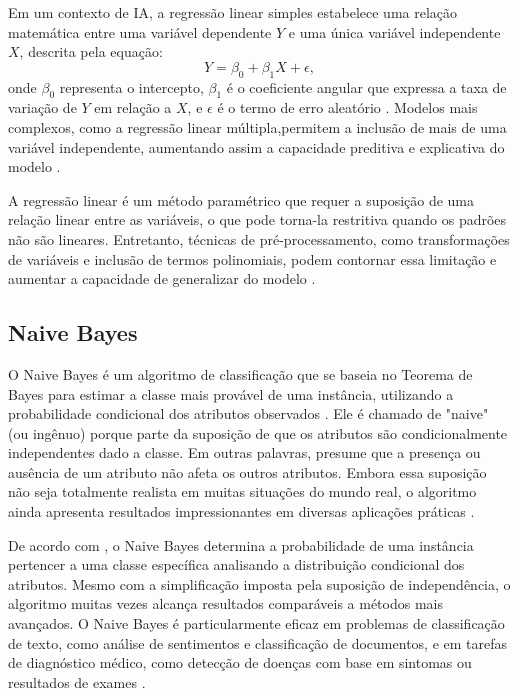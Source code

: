 Em um contexto de IA, a regressão linear simples estabelece uma relação matemática entre uma variável dependente \( Y \) e uma única variável independente \( X \), descrita pela equação:
\[
Y = \beta_0 + \beta_1 X + \epsilon,
\]
onde \( \beta_0 \) representa o intercepto, \( \beta_1 \) é o coeficiente angular que expressa a taxa de variação de \( Y \) em relação a \( X \), e \( \epsilon \) é o termo de erro aleatório \cite{rodrigues}. Modelos mais complexos, como a regressão linear múltipla,permitem a inclusão de mais de uma variável independente, aumentando assim a capacidade preditiva e explicativa do modelo \cite{rodrigues}.

A regressão linear é um método paramétrico que requer a suposição de uma relação linear entre as variáveis, o que pode torna-la restritiva quando os padrões não são lineares. Entretanto, técnicas de pré-processamento, como transformações de variáveis e inclusão de termos polinomiais, podem contornar essa limitação e aumentar a capacidade de generalizar do modelo \cite{montgomery2009}.

\subsection{Naive Bayes}
O Naive Bayes é um algoritmo de classificação que se baseia no Teorema de Bayes para estimar a classe mais provável de uma instância, utilizando a probabilidade condicional dos atributos observados \cite{rish2001}. Ele é chamado de "naive" (ou ingênuo) porque parte da suposição de que os atributos são condicionalmente independentes dado a classe. Em outras palavras, presume que a presença ou ausência de um atributo não afeta os outros atributos. Embora essa suposição não seja totalmente realista em muitas situações do mundo real, o algoritmo ainda apresenta resultados impressionantes em diversas aplicações práticas \cite{rish2001}.

De acordo com , o Naive Bayes determina a probabilidade de uma instância pertencer a uma classe específica analisando a distribuição condicional dos atributos. Mesmo com a simplificação imposta pela suposição de independência, o algoritmo muitas vezes alcança resultados comparáveis a métodos mais avançados. O Naive Bayes é particularmente eficaz em problemas de classificação de texto, como análise de sentimentos e classificação de documentos, e em tarefas de diagnóstico médico, como detecção de doenças com base em sintomas ou resultados de exames \cite{rish2001}.


